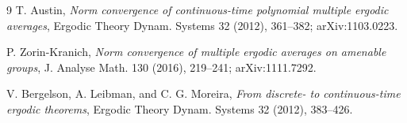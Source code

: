 \documentclass[11pt]{article}
\begin{document}
\begin{thebibliography}{9}
T. Austin, \emph{Norm convergence of continuous-time polynomial multiple
ergodic averages}, Ergodic Theory Dynam. Systems 32 (2012), 361--382;
arXiv:1103.0223.

P. Zorin-Kranich, \emph{Norm convergence of multiple ergodic averages on
amenable groups}, J. Analyse Math. 130 (2016), 219--241;
arXiv:1111.7292.

V. Bergelson, A. Leibman, and C. G. Moreira,
\emph{From discrete- to continuous-time ergodic theorems},
Ergodic Theory Dynam. Systems 32 (2012), 383--426.
\end{thebibliography}
\end{document}
